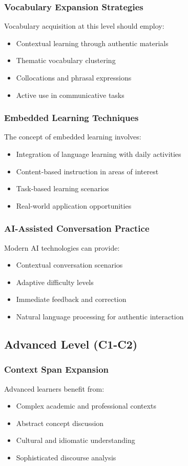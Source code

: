 \subsubsection{Vocabulary Expansion Strategies}
Vocabulary acquisition at this level should employ:
\begin{itemize}
    \item Contextual learning through authentic materials
    \item Thematic vocabulary clustering
    \item Collocations and phrasal expressions
    \item Active use in communicative tasks
\end{itemize}

\subsubsection{Embedded Learning Techniques}
The concept of embedded learning \citep{godwin2016gamification} involves:
\begin{itemize}
    \item Integration of language learning with daily activities
    \item Content-based instruction in areas of interest
    \item Task-based learning scenarios
    \item Real-world application opportunities
\end{itemize}

\subsubsection{AI-Assisted Conversation Practice}
Modern AI technologies can provide:
\begin{itemize}
    \item Contextual conversation scenarios
    \item Adaptive difficulty levels
    \item Immediate feedback and correction
    \item Natural language processing for authentic interaction
\end{itemize}

\subsection{Advanced Level (C1-C2)}
\subsubsection{Context Span Expansion}
Advanced learners benefit from:
\begin{itemize}
    \item Complex academic and professional contexts
    \item Abstract concept discussion
    \item Cultural and idiomatic understanding
    \item Sophisticated discourse analysis
\end{itemize}

